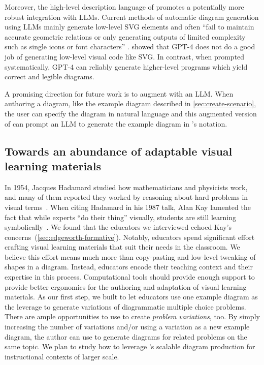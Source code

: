 Moreover, the high-level description language of \Edgeworth promotes a potentially more robust integration with LLMs. Current methods of automatic diagram generation using LLMs mainly generate low-level SVG elements and often ``fail to maintain accurate geometric relations or only generating outputs of limited complexity such as single icons or font characters'' \cite{belouadi2024automatikz}. \citet{penrosellm} showed that GPT-4 does not do a good job of generating low-level visual code like SVG. In contrast, when prompted systematically, GPT-4 can reliably generate higher-level \Penrose programs which yield correct and legible diagrams.

A promising direction for future work is to augment \Edgeworth with an LLM. When authoring a diagram, like the example diagram described in \cref{sec:create-scenario}, the \Edgeworth user can specify the diagram in natural language and this augmented version of \Edgeworth can prompt an LLM to generate the example diagram in \Edgeworth's notation. 


\subsection{Towards an abundance of adaptable visual learning materials}

In 1954, Jacques Hadamard studied how mathematicians and physicists work, and many of them reported they worked by reasoning about hard problems in visual terms~\mbox{\cite{Hadamard1997a}}. When citing Hadamard in his 1987 talk, Alan Kay lamented the fact that while experts ``do their thing'' visually, students are still learning symbolically~\cite{doingWithImages}. We found that the educators we interviewed echoed Kay's concerns~(\cref{sec:edgeworth-formative}). Notably, educators spend significant effort crafting visual learning materials that suit their needs in the classroom. We believe this effort means much more than copy-pasting and low-level tweaking of shapes in a diagram. Instead, educators encode their teaching context and their expertise in this process. Computational tools should provide enough support to provide better ergonomics for the authoring and adaptation of visual learning materials. As our first step, we built \Edgeworth to let educators use one example diagram as the leverage to generate variations of diagrammatic multiple choice problems. There are ample opportunities to use \Edgeworth to create \textit{problem variations}, too. By simply increasing the number of variations and/or using a variation as a new example diagram, the author can use \Edgeworth to generate diagrams for related problems on the same topic. We plan to study how to leverage \Edgeworth's scalable diagram production for instructional contexts of larger scale.
